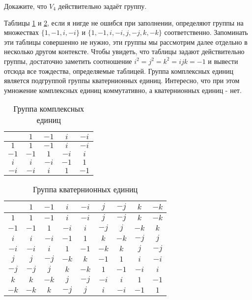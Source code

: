 \begin{exercise}
	Докажите, что $V_4$ действительно задаёт группу.
\end{exercise}

\begin{example}
	Таблицы \ref{tb:cmplxgrp} и \ref{tb:qtgrp}, если я нигде не ошибся при заполнении, определяют группы на множествах $\{1, -1, i, -i\}$ и $\{1, -1, i, -i, j, -j, k, -k\}$ соответственно. Запоминать эти таблицы совершенно не нужно, эти группы мы рассмотрим далее отдельно в несколько другом контексте. Чтобы увидеть, что таблицы задают действительно группы, достаточно заметить соотношение $i^2 = j^2 = k^2 = ijk = -1$ и вывести отсюда все тождества, определяемые таблицей. Группа комплексных единиц является подгруппой группы кватернионных единиц. Интересно, что при этом умножение комплексных единиц коммутативно, а кватернионных единиц - нет.
\end{example}

\begin{table}[h]
	\centering
	\begin{tabular}{c|cccc}
		& $1$ & $-1$ & $i$ & $-i$ \\ 
		\hline $1$ & $1$ & $-1$ & $i$ & $-i$ \\ 
		$-1$ & $-1$ & $1$ & $-i$ & $i$ \\ 
		$i$ & $i$ & $-i$ & $-1$ & $1$ \\ 
		$-i$ & $-i$ & $i$ & $1$ & $-1$ \\ 
	\end{tabular} 
	\caption{Группа комплексных единиц}\label{tb:cmplxgrp}
\end{table}

\begin{table}[h]
	\centering
	\begin{tabular}{c|cccccccc}
		& $1$ & $-1$ & $i$ & $-i$ & $j$ & $-j$ & $k$ & $-k$ \\ 
		\hline $1$ & $1$ & $-1$ & $i$ & $-i$ & $j$ & $-j$ & $k$ & $-k$  \\ 
		$-1$ & $-1$ & $1$&$-i$ &$i$ & $-j$ & $j$ & $-k$ & $k$ \\ 
		$i$ & $i$ & $-i$ & $-1$ & $1$ & $k$& $-k$ & $-j$ & $j$ \\ 
		$-i$ & $-i$ & $i$ & $1$ & $-1$ & $-k$& $k$ & $j$ & $-j$ \\ 
		$j$ & $j$ & $-j$ & $-k$ &$k$ & $-1$& $1$ & $i$ & $-i$ \\ 
		$-j$ & $-j$ & $j$ & $k$ &$-k$ & $1$& $-1$ & $-i$ & $i$ \\ 
		$k$ & $k$ & $-k$ & $j$ & $-j$ &$-i$ & $i$  & $1$ &$-1$  \\ 
		$-k$ & $-k$ & $k$ & $-j$ & $j$ &$i$ & $-i$  & $-1$ &$1$  \\ 
	\end{tabular}
	\caption{Группа кватернионных единиц}\label{tb:qtgrp}
\end{table}

